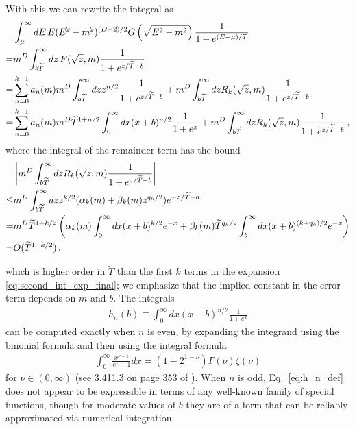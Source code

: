 \documentclass[sn-mathphys,Numbered]{sn-jnl}
\begin{document}
With this we can rewrite the integral as
\begin{align}
&\int_{\mu}^\infty dE\, E(E^2-m^2)^{(D-2)/2} G\left(\sqrt{E^2-m^2}\right)
    \frac{1}{1+e^{(E-\mu)/T}}   \\
    =&m^{D}\int_{b\widetilde{T}}^\infty dz\, F(\sqrt{z},m)\frac{1}{1+e^{z/\widetilde{T}-b}}\notag\\
    =&\sum_{n=0}^{k-1} a_n(m)m^{D}\int_{b\widetilde{T}}^\infty dz z^{n/2}\frac{1}{1+e^{z/\widetilde{T}-b}} +m^{D}\int_{b\widetilde{T}}^\infty dz R_k(\sqrt{z},m)\frac{1}{1+e^{z/\widetilde{T}-b}}\notag\\   
        =&\sum_{n=0}^{k-1} a_n(m)m^{D}\widetilde{T}^{1+n/2}\int_{0}^\infty dx (x+b)^{n/2}\frac{1}{1+e^{x}} +m^{D}\int_{b\widetilde{T}}^\infty dz R_k(\sqrt{z},m)\frac{1}{1+e^{z/\widetilde{T}-b}}\,,   \label{eq:second_int_exp_final}
\end{align}
where the integral of the remainder term has the bound
\begin{align}
 &\left|m^{D}\int_{b\widetilde{T}}^\infty dz R_k(\sqrt{z},m)\frac{1}{1+e^{z/\widetilde{T}-b}}\right|\\
 \leq&m^{D}\int_{b\widetilde{T}}^\infty dz z^{k/2}(\alpha_k(m)+\beta_k(m)z^{q_k/2})e^{-z/\widetilde{T}+b}\notag\\
 =&m^{D}\widetilde{T}^{1+k/2}\left(\alpha_k(m)\int_0^\infty dx (x+b)^{k/2}e^{-x}+\beta_k(m)\widetilde{T}^{q_k/2}\int_b^\infty dx (x+b)^{(k+q_k)/2}e^{-x}\right)\notag\\
 =&O(\widetilde{T}^{1+k/2})\,,\notag
\end{align}

which is higher order in $\widetilde{T}$ than the first $k$ terms in the expansion \eqref{eq:second_int_exp_final}; we emphasize that the implied constant in the error term  depends on $m$ and $b$.  The integrals
\begin{align}\label{eq:h_n_def}
    h_n(b)\equiv \int_{0}^\infty dx (x+b)^{n/2}\frac{1}{1+e^{x}}
\end{align}
can be computed exactly when $n$ is even, by expanding the integrand using the binonial formula and then using the integral formula
\begin{align}
    \int_0^\infty \frac{x^{\nu-1}}{e^{ x}+1}dx=(1-2^{1-\nu})\Gamma(\nu)\zeta(\nu)
\end{align}
for $\nu\in(0,\infty)$ (see 3.411.3 on page 353 of  \cite{integral_table_book}). When $n$ is odd, Eq.~\eqref{eq:h_n_def} 
does not appear to be expressible in terms of any well-known family of special functions, though for moderate values of $b$ they are of a form that can be reliably approximated via numerical integration.
\end{document}
